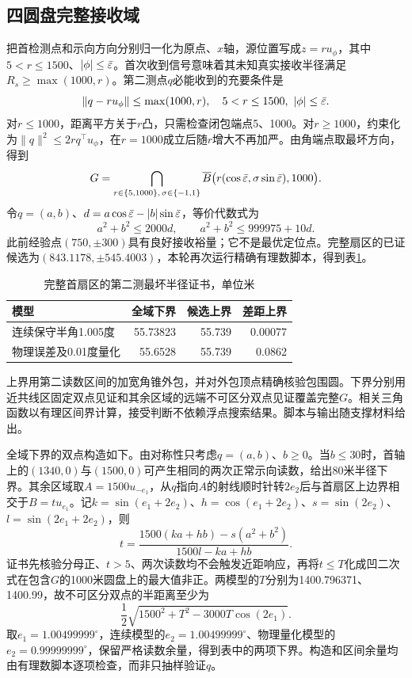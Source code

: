 \documentclass[UTF8,a4paper,zihao=-4,fontset=mac]{ctexart}
\begin{document}
\subsection{四圆盘完整接收域}
把首检测点和示向方向分别归一化为原点、$x$轴，源位置写成$z=ru_\phi$，其中$5<r\le1500$、$|\phi|\le\bar\varepsilon$。首次收到信号意味着其未知真实接收半径满足$R_s\ge\max(1000,r)$。第二测点$q$必能收到的充要条件是
\begin{equation}\|q-ru_\phi\|\le\max(1000,r),\quad 5<r\le1500,\ |\phi|\le\bar\varepsilon.\end{equation}
对$r\le1000$，距离平方关于$r$凸，只需检查闭包端点5、1000。对$r\ge1000$，约束化为$\|q\|^2\le2r q^\top u_\phi$，在$r=1000$成立后随$r$增大不再加严。由角端点取最坏方向，得到
\begin{equation}\label{eq:G}
G=\bigcap_{r\in\{5,1000\},\,\sigma\in\{-1,1\}}\overline B\big(r(\cos\bar\varepsilon,\sigma\sin\bar\varepsilon),1000\big).
\end{equation}
令$q=(a,b)$、$d=a\cos\bar\varepsilon-|b|\sin\bar\varepsilon$，等价代数式为
\begin{equation}a^2+b^2\le2000d,\qquad a^2+b^2\le999975+10d.\end{equation}
此前经验点$(750,\pm300)$具有良好接收裕量；它不是最优定位点。完整扇区的已证候选为$(843.1178,\pm545.4003)$，本轮再次运行精确有理数脚本，得到表\ref{tab:q2}。
\begin{table}[H]\centering\caption{完整首扇区的第二测最坏半径证书，单位米}\label{tab:q2}
\begin{tabular}{lrrr}\toprule 模型&全域下界&候选上界&差距上界\\\midrule
连续保守半角1.005度&55.73823&55.739&0.00077\\
物理误差及0.01度量化&55.6528&55.739&0.0862\\\bottomrule\end{tabular}\end{table}
上界用第二读数区间的加宽角锥外包，并对外包顶点精确核验包围圆。下界分别用近共线区固定双点见证和其余区域的远端不可区分双点见证覆盖完整$G$。相关三角函数以有理区间界计算，接受判断不依赖浮点搜索结果。脚本与输出随支撑材料给出。

全域下界的双点构造如下。由对称性只考虑$q=(a,b)$、$b\ge0$。当$b\le30$时，首轴上的$(1340,0)$与$(1500,0)$可产生相同的两次正常示向读数，给出80米半径下界。其余区域取$A=1500u_{-e_1}$，从$q$指向$A$的射线顺时针转$2e_2$后与首扇区上边界相交于$B=t u_{e_1}$。记$k=\sin(e_1+2e_2)$、$h=\cos(e_1+2e_2)$、$s=\sin(2e_2)$、$l=\sin(2e_1+2e_2)$，则
\begin{equation}
t=\frac{1500(ka+hb)-s(a^2+b^2)}{1500l-ka+hb}.
\end{equation}
证书先核验分母正、$t>5$、两次读数均不会触发近距响应，再将$t\le T$化成凹二次式在包含$G$的1000米圆盘上的最大值非正。两模型的$T$分别为1400.796371、1400.99，故不可区分双点的半距离至少为
\begin{equation}
\frac12\sqrt{1500^2+T^2-3000T\cos(2e_1)}.
\end{equation}
取$e_1=1.00499999^\circ$，连续模型的$e_2=1.00499999^\circ$、物理量化模型的$e_2=0.99999999^\circ$，保留严格读数余量，得到表中的两项下界。构造和区间余量均由有理数脚本逐项检查，而非只抽样验证$q$。
\end{document}
